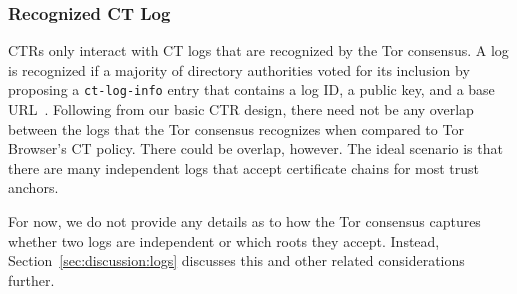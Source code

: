 
\subsubsection{Recognized CT Log} \label{sec:base:consensus:log}
CTRs only interact with CT logs that are recognized by the Tor consensus.  A log
is recognized if a majority of directory authorities voted for its inclusion by
proposing a \texttt{ct-log-info} entry that contains a log ID, a public key, and
a base URL~\cite{ct,ct/bis}. 
Following from our basic CTR design, there need not be any overlap between the
logs that the Tor consensus recognizes when compared to Tor Browser's CT policy.
There could be overlap, however.  The ideal scenario is that there are many
independent logs that accept certificate chains for most trust anchors.

For now, we do not provide any details as to how the Tor consensus captures
whether two logs are independent or which roots they accept.  Instead,
Section~\ref{sec:discussion:logs} discusses this and other related
considerations further.

